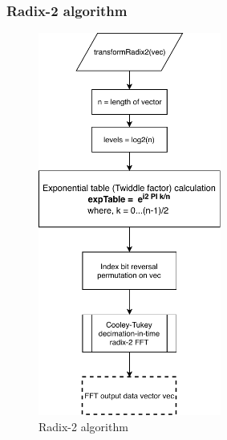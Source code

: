 \begin{refsection}
\newpage
\subsubsection{Radix-2 algorithm}
\begin{figure}[h]
	\centering
	\includegraphics[width=6cm]{./algorithms/fft/figures/Radix2.pdf}
	\caption{Radix-2 algorithm}\label{Radix-2}
\end{figure}

\newpage

\end{refsection}
